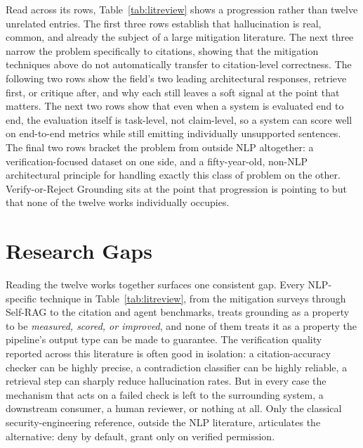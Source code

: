 \documentclass[12pt,a4paper]{report}
\begin{document}
Read across its rows, Table~\ref{tab:litreview} shows a progression rather
than twelve unrelated entries. The first three rows establish that
hallucination is real, common, and already the subject of a large mitigation
literature. The next three narrow the problem specifically to citations,
showing that the mitigation techniques above do not automatically transfer to
citation-level correctness. The following two rows show the field's two
leading architectural responses, retrieve first, or critique after, and
why each still leaves a soft signal at the point that matters. The next two
rows show that even when a system is evaluated end to end, the evaluation
itself is task-level, not claim-level, so a system can score well on
end-to-end metrics while still emitting individually unsupported sentences.
The final two rows bracket the problem from outside NLP altogether: a
verification-focused dataset on one side, and a fifty-year-old, non-NLP
architectural principle for handling exactly this class of problem on the
other. Verify-or-Reject Grounding sits at the point that progression is
pointing to but that none of the twelve works individually occupies.

\section{Research Gaps}
\label{sec:research-gaps}
Reading the twelve works together surfaces one consistent gap. Every
NLP-specific technique in Table~\ref{tab:litreview}, from the mitigation
surveys through Self-RAG to the citation and agent benchmarks, treats
grounding as a property to be \emph{measured, scored, or improved}, and none
of them treats it as a property the pipeline's output type can be made to
guarantee. The verification quality reported across this literature is often
good in isolation: a citation-accuracy checker can be highly precise, a
contradiction classifier can be highly reliable, a retrieval step can sharply
reduce hallucination rates. But in every case the mechanism that acts on a
failed check is left to the surrounding system, a downstream consumer, a
human reviewer, or nothing at all. Only the classical security-engineering
reference, outside the NLP literature, articulates the alternative: deny by
default, grant only on verified permission.
\end{document}
